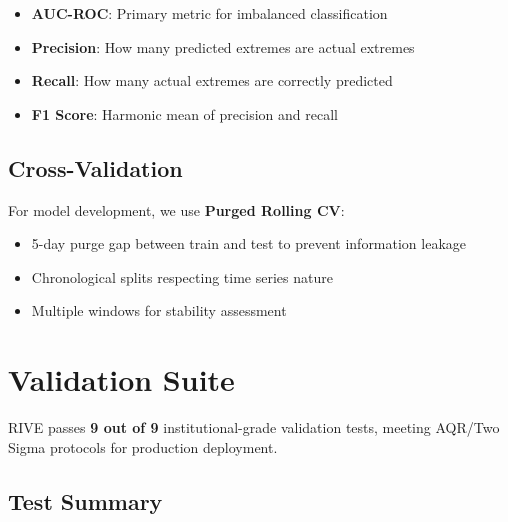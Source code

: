 \documentclass[12pt,a4paper]{article}
\begin{document}
\begin{itemize}
    \item \textbf{AUC-ROC}: Primary metric for imbalanced classification
    \item \textbf{Precision}: How many predicted extremes are actual extremes
    \item \textbf{Recall}: How many actual extremes are correctly predicted
    \item \textbf{F1 Score}: Harmonic mean of precision and recall
\end{itemize}

\subsection{Cross-Validation}

For model development, we use \textbf{Purged Rolling CV}:
\begin{itemize}
    \item 5-day purge gap between train and test to prevent information leakage
    \item Chronological splits respecting time series nature
    \item Multiple windows for stability assessment
\end{itemize}

\section{Validation Suite}

RIVE passes \textbf{9 out of 9} institutional-grade validation tests, meeting AQR/Two Sigma protocols for production deployment.

\subsection{Test Summary}
\end{document}
